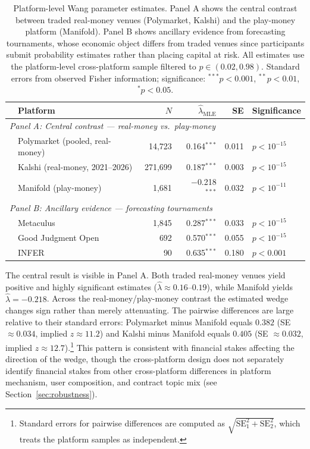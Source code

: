 \documentclass[12pt]{article}
\begin{document}
\begin{table}[h]
\centering
\footnotesize
\caption{Platform-level Wang parameter estimates. Panel A shows the central contrast between traded real-money venues (Polymarket, Kalshi) and the play-money platform (Manifold). Panel B shows ancillary evidence from forecasting tournaments, whose economic object differs from traded venues since participants submit probability estimates rather than placing capital at risk. All estimates use the platform-level cross-platform sample filtered to $p \in (0.02, 0.98)$. Standard errors from observed Fisher information; significance: $^{***}p<0.001$, $^{**}p<0.01$, $^{*}p<0.05$.}
\label{tab:platform}
\begin{tabular}{llrrrl}
\toprule
& Platform & $N$ & $\hat\lambda_{\mathrm{MLE}}$ & SE & Significance \\
\midrule
\multicolumn{6}{l}{\textit{Panel A: Central contrast --- real-money vs.\ play-money}} \\
& Polymarket (pooled, real-money) & 14,723 & 0.164$^{***}$ & 0.011 & $p < 10^{-15}$ \\
& Kalshi (real-money, 2021--2026) & 271,699 & 0.187$^{***}$ & 0.003 & $p < 10^{-15}$ \\
& Manifold (play-money) & 1,681 & $-$0.218$^{***}$ & 0.032 & $p < 10^{-11}$ \\
\midrule
\multicolumn{6}{l}{\textit{Panel B: Ancillary evidence --- forecasting tournaments}} \\
& Metaculus & 1,845 & 0.287$^{***}$ & 0.033 & $p < 10^{-15}$ \\
& Good Judgment Open & 692 & 0.570$^{***}$ & 0.055 & $p < 10^{-15}$ \\
& INFER & 90 & 0.635$^{***}$ & 0.180 & $p < 0.001$ \\
\bottomrule
\end{tabular}
\end{table}

The central result is visible in Panel A. Both traded real-money venues yield positive and highly significant estimates ($\hat\lambda \approx 0.16$--$0.19$), while Manifold yields $\hat\lambda = -0.218$. Across the real-money/play-money contrast the estimated wedge changes sign rather than merely attenuating. The pairwise differences are large relative to their standard errors: Polymarket minus Manifold equals $0.382$ (SE $\approx 0.034$, implied $z \approx 11.2$) and Kalshi minus Manifold equals $0.405$ (SE $\approx 0.032$, implied $z \approx 12.7$).\footnote{Standard errors for pairwise differences are computed as $\sqrt{\mathrm{SE}_1^2 + \mathrm{SE}_2^2}$, which treats the platform samples as independent.} This pattern is consistent with financial stakes affecting the direction of the wedge, though the cross-platform design does not separately identify financial stakes from other cross-platform differences in platform mechanism, user composition, and contract topic mix (see Section~\ref{sec:robustness}).
\end{document}
